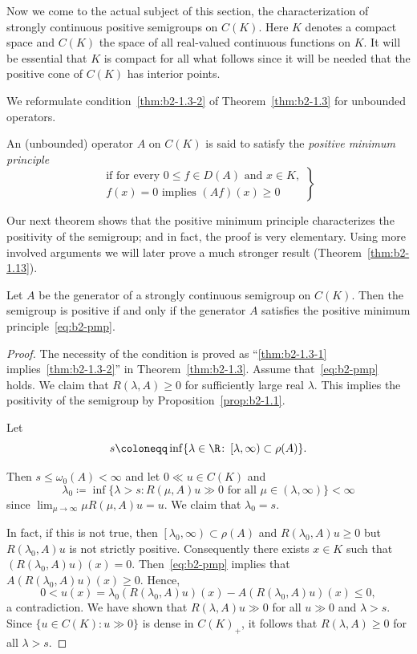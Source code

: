 Now we come to the actual subject of this section, the characterization of strongly continuous positive semigroups on $C(K)$.
Here $K$ denotes a compact space and $C(K)$ the space of all real-valued continuous functions on $K$.
It will be essential that $K$ is compact for all what follows since it will be needed that the positive cone of\/ $C(K)$ has interior points.

We reformulate condition~\ref{thm:b2-1.3-2} of Theorem~\ref{thm:b2-1.3} for unbounded operators.
\begin{definition}\label{def:b2-1.5}
An (unbounded) operator $A$ on $C(K)$ is said to satisfy the \emph{positive minimum principle}  
\begin{equation*}\label{eq:b2-pmp} \tag{P}
\left.
\begin{split}
	\text{if for every } 0 \leq f \in D(A) \text{ and } x \in K,\\
    f(x) = 0 \text{ implies } (Af)(x) \geq 0
\end{split} 
\right\}   
\end{equation*}
\end{definition}
Our next theorem shows that the positive minimum principle characterizes the positivity of the semigroup; and in fact, the proof is very elementary.
Using more involved arguments we will later prove a much stronger result (Theorem~\ref{thm:b2-1.13}).
\begin{theorem}\label{thm:b2-1.6}
Let $A$ be the generator of a strongly continuous semigroup on $C(K)$.
Then the semigroup is positive if and only if the generator $A$ satisfies the positive minimum principle~\eqref{eq:b2-pmp}.
\end{theorem}
\begin{proof}
The necessity of the condition is proved as 
\enquote{\ref{thm:b2-1.3-1} implies~\ref{thm:b2-1.3-2}} in Theorem~\ref{thm:b2-1.3}.
Assume that~\eqref{eq:b2-pmp} holds.
We claim that $R(\lambda,A) \geq 0$ for sufficiently large real $\lambda$. 
This implies the positivity of the semigroup by Proposition~\ref{prop:b2-1.1}.

Let 
%
\[
	s \coloneqq \inf \{\lambda \in \R \colon \left[\lambda,\infty \right) \subset \rho(A)\}.
\]
%

Then $s \leq \omega_{0}(A) < \infty$ and let $0 \ll u \in C(K)$ and  
\[
\lambda_{0} \coloneqq \inf \{\lambda > s \colon R(\mu,A)u \gg 0 \text{ for all } \mu \in (\lambda,\infty)\} < \infty
\]
since $\lim_{\mu \to \infty} \mu R(\mu,A)u = u$.
We claim that $\lambda_{0} = s$.

In fact, if this is not true, then $\left[\lambda_{0},\infty\right) \subset \rho(A)$ and $R(\lambda_{0},A)u \geq 0$ but $R(\lambda_{0},A)u$ is not strictly positive.
Consequently there exists $x \in K$ such that $(R(\lambda_{0},A)u)(x) = 0$.
Then~\eqref{eq:b2-pmp} implies that $A(R(\lambda_{0},A)u)(x) \geq 0$.
Hence, 
\[
0 < u(x) = \lambda_{0}(R(\lambda_{0},A)u)(x) - A(R(\lambda_{0},A)u)(x) \leq 0,
\]
a contradiction.
We have shown that $R(\lambda,A)u \gg 0$ for all $u \gg 0$ and $\lambda > s$.
Since $\{u \in C(K): u \gg 0\}$ is dense in $C(K)_{+}$, it follows that $R(\lambda,A) \geq 0$ for all $\lambda > s$.
\end{proof}
